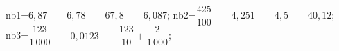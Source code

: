\documentclass[exercice]{thedocument}%
\begin{document}
%
    \>nb1={$6,87\qquad 6,78\qquad 67,8\qquad 6,087$};%
    \>nb2={$\dfrac{425}{100}\qquad 4,251\qquad 4,5\qquad 40,12$};%
    \>nb3={$\dfrac{123}{1\,000}\qquad0,0123\qquad\dfrac{123}{10}+\dfrac{2}{1\,000}$};%
\end{document}
